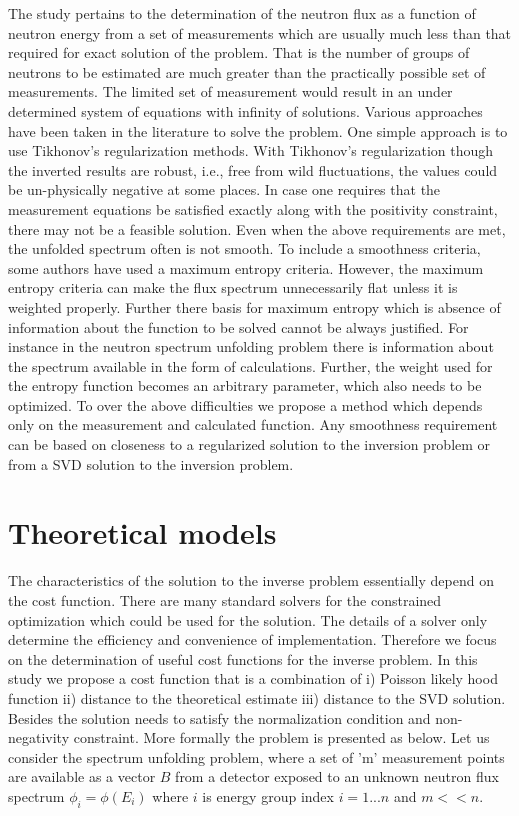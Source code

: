 \documentclass[review]{elsarticle}
\begin{document}
The study pertains to the determination of the neutron flux as a function of neutron energy from a set of measurements which are usually much less than that required for exact solution of the problem.  That is the number of groups of neutrons to be estimated are much greater than the practically possible set of measurements. The limited set of measurement would result in an under determined system of equations with infinity of solutions. Various approaches have been taken in the literature to solve the problem\cite{}. One simple approach is to use Tikhonov's regularization methods\cite{Tikhonov}. With Tikhonov's  regularization though the inverted results are robust, i.e., free from wild fluctuations, the values could be un-physically negative at some places. In case one requires that the measurement equations be satisfied exactly along with the positivity constraint,  there may not be a feasible solution. Even when the above requirements are met, the unfolded spectrum often is not smooth. To include a smoothness criteria, some authors have used a maximum entropy criteria\cite{Iguchi}. However, the maximum entropy criteria can make the flux spectrum unnecessarily flat unless it is weighted properly. Further there basis for maximum entropy which is absence of information about the function to be solved cannot be always justified. For instance in the neutron spectrum unfolding problem there is information about the spectrum available in the form of calculations. Further, the weight used for the entropy function becomes an arbitrary parameter, which also needs to be optimized. To over the above difficulties we propose a method which depends only on the measurement and calculated function.  Any smoothness requirement can be based on closeness to a regularized solution to the inversion problem or from a SVD solution to the inversion problem.  


\section{Theoretical models}

The characteristics of the solution to the inverse problem essentially depend on the cost function. There are many standard solvers for the constrained optimization which could be used for the solution. The details of a solver only determine the efficiency and convenience of implementation. Therefore we focus on the determination of useful cost functions for the inverse problem.  In this study we propose a cost function that is a combination of  i) Poisson likely hood function ii) distance to the theoretical estimate iii) distance to the SVD solution. Besides the solution needs to satisfy the normalization condition and non-negativity constraint. 
More formally the problem is presented as below. Let us consider the spectrum unfolding problem, where a set of 'm' measurement points are available as a vector $B$ from a detector exposed to an unknown neutron flux spectrum $\phi_i=\phi(E_i)$ where $i$ is energy group index $i=1 ... n$  and $m << n$.
 
\end{document}
